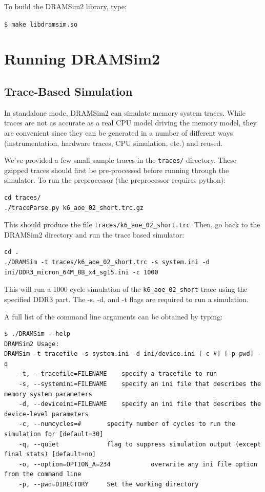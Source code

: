 \documentclass[11pt]{article}
\begin{document}
	To build the DRAMSim2 library, type: 

	\texttt{\$ make libdramsim.so }

\section{Running DRAMSim2}
\begin{minipage}{\textwidth}
\subsection{Trace-Based Simulation}

In standalone mode, DRAMSim2 can simulate memory system traces. While traces are not as accurate
as a real CPU model driving the memory model, they are convenient since they can be generated in a number of different
ways (instrumentation, hardware traces, CPU simulation, etc.) and reused. 

We've provided a few small sample traces in the \texttt{traces/} directory. These gzipped
traces should first be pre-processed before running through the simulator. 
To run the preprocessor (the preprocessor requires python): 
\begin{lstlisting}
cd traces/
./traceParse.py k6_aoe_02_short.trc.gz
\end{lstlisting}
	This should produce the file \texttt{traces/k6\_aoe\_02\_short.trc}. Then, go back to the DRAMSim2 directory and run the trace based simulator:

\begin{lstlisting}
cd .
./DRAMSim -t traces/k6_aoe_02_short.trc -s system.ini -d ini/DDR3_micron_64M_8B_x4_sg15.ini -c 1000
\end{lstlisting}
	This will run a 1000 cycle simulation of the \texttt{k6\_aoe\_02\_short} trace using 
	the specified DDR3 part. The -s, -d, and -t flags are required to run a simulation.

	A full list of the command line arguments can be obtained by typing:
\begin{lstlisting}
$ ./DRAMSim --help
DRAMSim2 Usage: 
DRAMSim -t tracefile -s system.ini -d ini/device.ini [-c #] [-p pwd] -q
	-t, --tracefile=FILENAME 	specify a tracefile to run  
	-s, --systemini=FILENAME 	specify an ini file that describes the memory system parameters  
	-d, --deviceini=FILENAME 	specify an ini file that describes the device-level parameters
	-c, --numcycles=# 		specify number of cycles to run the simulation for [default=30] 
	-q, --quiet 			flag to suppress simulation output (except final stats) [default=no]
	-o, --option=OPTION_A=234			overwrite any ini file option from the command line
	-p, --pwd=DIRECTORY		Set the working directory


\end{lstlisting}
\end{minipage}
\end{document}

